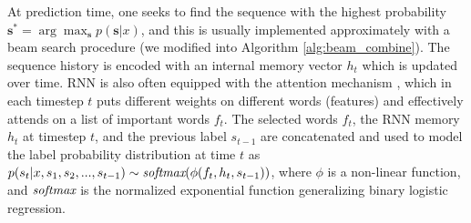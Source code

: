 At prediction time, one seeks to find the sequence with the highest probability $\mathbf{s}^*=\arg\max_\mathbf{s} p(\mathbf{s}|x)$, and this is usually implemented approximately with a beam search procedure \cite{lowerre1976harpy} (we modified into Algorithm \ref{alg:beam_combine}). The sequence history is encoded with an internal memory vector $h_t$ which is updated over time. RNN is also often equipped with the attention mechanism \cite{DBLP:journals/corr/BahdanauCB14}, which in each  timestep $t$ puts different weights on different words (features) and effectively attends on a list of important words $f_t$. The selected words $f_t$, the RNN memory $h_t$ at timestep $t$, and the previous label ${s_{t-1}}$ are concatenated and used to model the label probability distribution at time $t$ as $p(s_t|x,s_1,s_2,...,s_{t-1}) \sim  \textit{softmax}(\phi(f_t,h_t,s_{t-1}))$, where $\phi$ is a non-linear function, and $\textit{softmax}$ is the normalized exponential function generalizing binary logistic regression.  %


